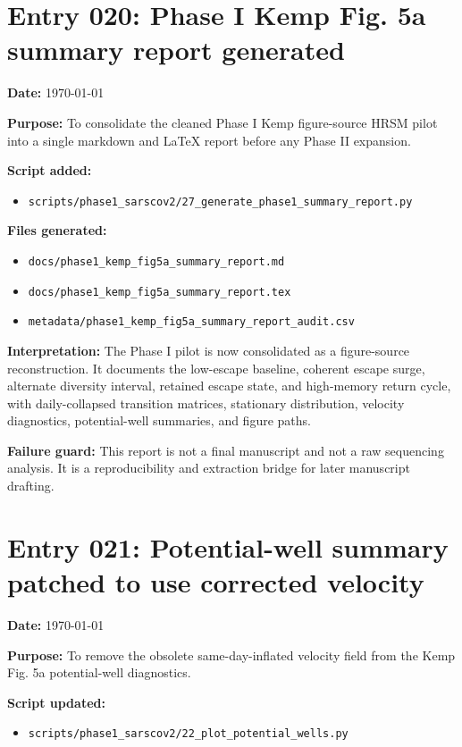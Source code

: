\section*{Entry 020: Phase I Kemp Fig. 5a summary report generated}

\textbf{Date:} \today

\textbf{Purpose:} To consolidate the cleaned Phase I Kemp figure-source HRSM pilot into a single markdown and LaTeX report before any Phase II expansion.

\textbf{Script added:}
\begin{itemize}
    \item \texttt{scripts/phase1\_sarscov2/27\_generate\_phase1\_summary\_report.py}
\end{itemize}

\textbf{Files generated:}
\begin{itemize}
    \item \texttt{docs/phase1\_kemp\_fig5a\_summary\_report.md}
    \item \texttt{docs/phase1\_kemp\_fig5a\_summary\_report.tex}
    \item \texttt{metadata/phase1\_kemp\_fig5a\_summary\_report\_audit.csv}
\end{itemize}

\textbf{Interpretation:} The Phase I pilot is now consolidated as a figure-source reconstruction. It documents the low-escape baseline, coherent escape surge, alternate diversity interval, retained escape state, and high-memory return cycle, with daily-collapsed transition matrices, stationary distribution, velocity diagnostics, potential-well summaries, and figure paths.

\textbf{Failure guard:} This report is not a final manuscript and not a raw sequencing analysis. It is a reproducibility and extraction bridge for later manuscript drafting.


\section*{Entry 021: Potential-well summary patched to use corrected velocity}

\textbf{Date:} \today

\textbf{Purpose:} To remove the obsolete same-day-inflated velocity field from the Kemp Fig. 5a potential-well diagnostics.

\textbf{Script updated:}
\begin{itemize}
    \item \texttt{scripts/phase1\_sarscov2/22\_plot\_potential\_wells.py}
\end{itemize}

